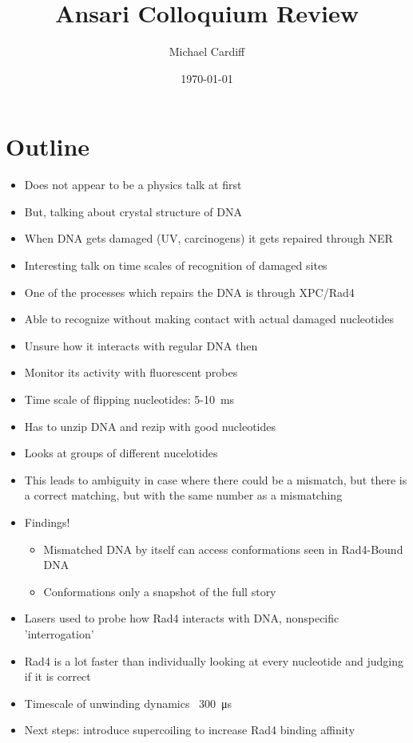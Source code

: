 \documentclass[12pt]{article}
\title{\vspace{-3em}Ansari Colloquium Review}
\author{Michael Cardiff}
\date{\today}
\begin{document}
\maketitle

\section{Outline}
\begin{itemize}
\item Does not appear to be a physics talk at first
\item But, talking about crystal structure of DNA
\item When DNA gets damaged (UV, carcinogens) it gets repaired through NER
\item Interesting talk on time scales of recognition of damaged sites
\item One of the processes which repairs the DNA is through XPC/Rad4
\item Able to recognize without making contact with actual damaged nucleotides
\item Unsure how it interacts with regular DNA then
\item Monitor its activity with fluorescent probes
\item Time scale of flipping nucleotides: 5-\SI{10}{\ms}
\item Has to unzip DNA and rezip with good nucleotides
\item Looks at groups of different nucelotides
\item This leads to ambiguity in case where there could be a mismatch, but there is a correct matching, but with the same number as a mismatching
\item Findings!
  \begin{itemize}
  \item Mismatched DNA by itself can access conformations seen in Rad4-Bound DNA
  \item Conformations only a snapshot of the full story
  \end{itemize}
\item Lasers used to probe how Rad4 interacts with DNA, nonspecific 'interrogation'
\item Rad4 is a lot faster than individually looking at every nucleotide and judging if it is correct
\item Timescale of unwinding dynamics ~\SI{300}{\micro\s}
\item Next steps: introduce supercoiling to increase Rad4 binding affinity
\end{itemize}
\end{document}
